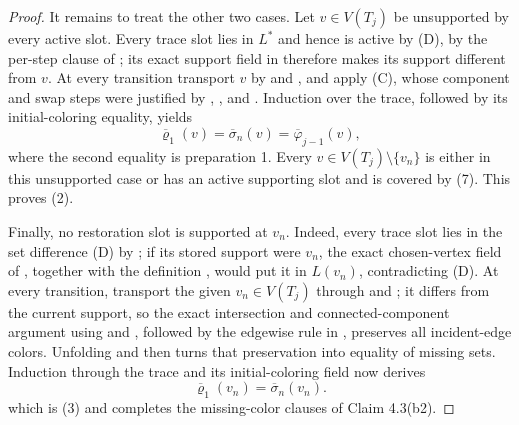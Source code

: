 \begin{proof}
It remains to treat the other two cases.  Let \(v\in V(T_j)\) be
unsupported by every active slot.  Every trace slot lies in \(L^*\) and
hence is active by (D), by the per-step clause of
; its exact support field in
 therefore makes its support
different from \(v\).
At every transition transport \(v\) by
 and
, and apply (C), whose component and swap
steps were justified by ,
, and
.  Induction over the trace, followed by
its initial-coloring equality, yields
\[
                 \overline{\varrho}_1(v)
                 =\overline{\sigma}_n(v)
                 =\overline{\varphi}_{j-1}(v),                \tag{4}
\]
where the second equality is preparation 1.  Every
\(v\in V(T_j)\setminus\{v_n\}\) is either in this unsupported case or
has an active supporting slot and is covered by (7).  This proves (2).

Finally, no restoration slot is supported at \(v_n\).  Indeed, every
trace slot lies in the set difference (D) by
; if its stored support were
\(v_n\), the exact chosen-vertex field of
, together with the definition
, would put it in \(L(v_n)\),
contradicting (D).  At every transition, transport the given
\(v_n\in V(T_j)\) through  and
; it differs from the current support, so
the exact intersection and connected-component argument using
 and , followed
by the edgewise rule in , preserves all
incident-edge colors.  Unfolding  and then
 turns that preservation into equality of missing
sets.  Induction through the trace and its initial-coloring field now
derives
\[
             \overline{\varrho}_1(v_n)
                =\overline{\sigma}_n(v_n).                    \tag{3}
\]
which is (3) and completes the missing-color clauses of Claim 4.3(b2).
\end{proof}
